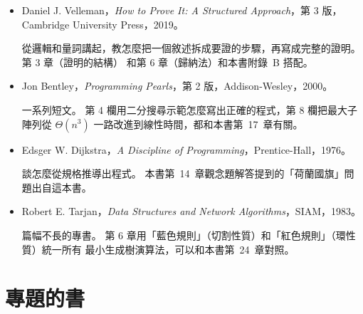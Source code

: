 \begin{itemize}
隨機演算法和機率分析的課本。 第 1--3 章（期望值、變異數）和第 5 章（球與箱子）是雜湊、
隨機演算法分析用到的機率，和本書附錄~A 搭配。

\item Daniel J. Velleman，\textit{How to Prove It: A Structured Approach}，第 3 版，
Cambridge University Press，2019。

從邏輯和量詞講起，教怎麼把一個敘述拆成要證的步驟，再寫成完整的證明。 第 3 章（證明的結構）
和第 6 章（歸納法）和本書附錄~B 搭配。

\item Jon Bentley，\textit{Programming Pearls}，第 2 版，Addison-Wesley，2000。

一系列短文。 第 4 欄用二分搜尋示範怎麼寫出正確的程式，第 8 欄把最大子陣列從
$\Theta(n^3)$ 一路改進到線性時間，都和本書第~17~章有關。

\item Edsger W. Dijkstra，\textit{A Discipline of Programming}，Prentice-Hall，1976。

談怎麼從規格推導出程式。 本書第~14~章觀念題解答提到的「荷蘭國旗」問題出自這本書。

\item Robert E. Tarjan，\textit{Data Structures and Network Algorithms}，SIAM，1983。

篇幅不長的專書。 第 6 章用「藍色規則」（切割性質）和「紅色規則」（環性質）統一所有
最小生成樹演算法，可以和本書第~24~章對照。
\end{itemize}

\section*{專題的書}

